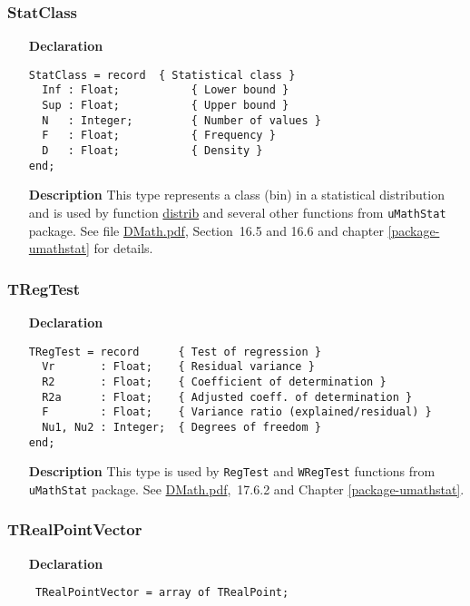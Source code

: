 \documentclass[12pt,a4paper,oneside]{report}
\newcommand{\lmath}[1]{   %
	\marginpar{\vspace{#1} 
		\begin{flushright}
			LMath
	\end{flushright} }
}
\newcommand{\declarationitem}[1]{\textbf{#1}}
\newcommand{\descriptiontitle}[1]{\textbf{#1}}
\newcommand{\code}[1]{\texttt{#1}}
\begin{document}
\subsubsection{StatClass}
\begin{itemize}
	\item[\declarationitem{Declaration}\hfill]
	\begin{verbatim}
StatClass = record  { Statistical class }
  Inf : Float;           { Lower bound }
  Sup : Float;           { Upper bound }
  N   : Integer;         { Number of values }
  F   : Float;           { Frequency }
  D   : Float;           { Density }
end;
	\end{verbatim}
	\item[\descriptiontitle{Description}]
This type represents a class (bin) in a statistical distribution and is used by function \hyperref[udistrib]{distrib} and several other functions from \code{uMathStat} package. See file \href{DMath.pdf}{DMath.pdf}, Section~16.5 and 16.6 and chapter \ref{package-umathstat} for details. 
\end{itemize}

\subsubsection{TRegTest}
\begin{itemize}
	\item[\declarationitem{Declaration}\hfill]
	\begin{verbatim}
TRegTest = record      { Test of regression }
  Vr       : Float;    { Residual variance }
  R2       : Float;    { Coefficient of determination }
  R2a      : Float;    { Adjusted coeff. of determination }
  F        : Float;    { Variance ratio (explained/residual) }
  Nu1, Nu2 : Integer;  { Degrees of freedom }
end;
	\end{verbatim}
	\item[\descriptiontitle{Description}]
This type is used by \code{RegTest} and \code{WRegTest} functions from \code{uMathStat} package. See \href{DMath.pdf}{DMath.pdf},~17.6.2 and Chapter \ref{package-umathstat}.
\end{itemize}

\subsubsection{TRealPointVector}
\lmath{-24pt}
\label{utypes-TRealPointVector}
\begin{itemize}\item[\declarationitem{Declaration}\hfill]
	\begin{flushleft}
		\code{
			TRealPointVector =  array of TRealPoint;}
		
	\end{flushleft}
	
\end{itemize}
\end{document}
